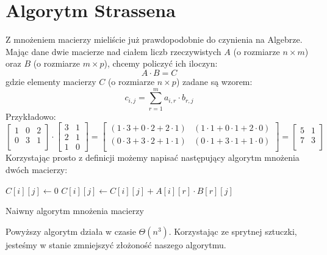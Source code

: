 \section{Algorytm Strassena}

\label{sec:strassen}

Z mnożeniem macierzy mieliście już prawdopodobnie do czynienia na Algebrze.
Mając dane dwie macierze nad ciałem liczb rzeczywistych $A$ (o rozmiarze $n \times m$) oraz $B$ (o rozmiarze $m \times p$), chcemy policzyć ich iloczyn:
\[
 A \cdot B = C
\]
gdzie elementy macierzy $C$ (o rozmiarze $n \times p$) zadane są wzorem:
\[
 c_{i,j} = \sum_{r=1}^{m} a_{i,r} \cdot b_{r,j}
\]
Przykładowo:
\[
  \begin{bmatrix}
    1 & 0 & 2 \\
    0 & 3 & 1 \\
  \end{bmatrix}
\cdot
  \begin{bmatrix}
    3 & 1 \\
    2 & 1 \\
    1 & 0
  \end{bmatrix}
=
  \begin{bmatrix}
     (1 \cdot 3  +  0 \cdot 2  +  2 \cdot 1) & (1 \cdot 1   +   0 \cdot 1   +   2 \cdot 0) \\
     (0 \cdot 3  +  3 \cdot 2  +  1 \cdot 1) & (0 \cdot 1   +   3 \cdot 1   +   1 \cdot 0) \\
  \end{bmatrix}
=
  \begin{bmatrix}
    5 & 1 \\
    7 & 3 \\
  \end{bmatrix}
\]
Korzystając prosto z definicji możemy napisać następujący algorytm mnożenia dwóch macierzy:

\begin{algorithm}[H]
  \DontPrintSemicolon
  
  
  
  {
     {
	$C[i][j] \leftarrow 0$\;
	{
	  $C[i][j] \leftarrow C[i][j] + A[i][r] \cdot B[r][j]$\;
	}
     }
  }
  
  \caption{Naiwny algorytm mnożenia macierzy}
  \label{alg-mnozenie-macierzy}
\end{algorithm}
Powyższy algorytm działa w czasie $\Theta(n^3)$.
Korzystając ze sprytnej sztuczki, jesteśmy w stanie zmniejszyć złożoność naszego algorytmu.

